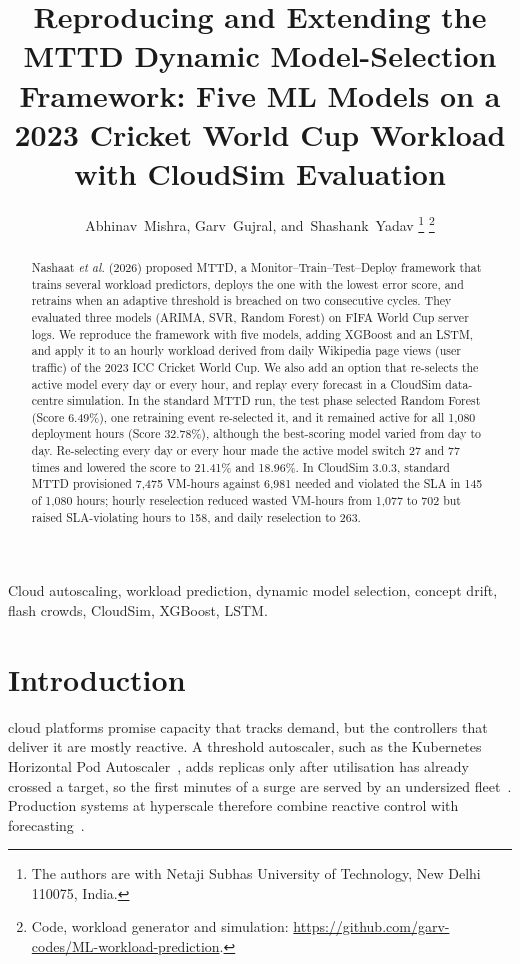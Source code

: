 \documentclass[journal,onecolumn,11pt]{IEEEtran}
\begin{document}
\title{Reproducing and Extending the MTTD Dynamic Model-Selection Framework: Five ML Models on a 2023 Cricket World Cup Workload with CloudSim Evaluation}

\author{Abhinav~Mishra, Garv~Gujral, and~Shashank~Yadav%
\thanks{The authors are with Netaji Subhas University of Technology, New Delhi 110075, India.}%
\thanks{Code, workload generator and simulation: \url{https://github.com/garv-codes/ML-workload-prediction}.}}

\maketitle

\begin{abstract}
Nashaat \emph{et al.} (2026) proposed MTTD, a Monitor--Train--Test--Deploy framework that trains several workload predictors, deploys the one with the lowest error score, and retrains when an adaptive threshold is breached on two consecutive cycles. They evaluated three models (ARIMA, SVR, Random Forest) on FIFA World Cup server logs. We reproduce the framework with five models, adding XGBoost and an LSTM, and apply it to an hourly workload derived from daily Wikipedia page views (user traffic) of the 2023 ICC Cricket World Cup. We also add an option that re-selects the active model every day or every hour, and replay every forecast in a CloudSim data-centre simulation. In the standard MTTD run, the test phase selected Random Forest (Score 6.49\%), one retraining event re-selected it, and it remained active for all 1,080 deployment hours (Score 32.78\%), although the best-scoring model varied from day to day. Re-selecting every day or every hour made the active model switch 27 and 77 times and lowered the score to 21.41\% and 18.96\%. In CloudSim 3.0.3, standard MTTD provisioned 7,475 VM-hours against 6,981 needed and violated the SLA in 145 of 1,080 hours; hourly reselection reduced wasted VM-hours from 1,077 to 702 but raised SLA-violating hours to 158, and daily reselection to 263.
\end{abstract}

\begin{IEEEkeywords}
Cloud autoscaling, workload prediction, dynamic model selection, concept drift, flash crowds, CloudSim, XGBoost, LSTM.
\end{IEEEkeywords}

\section{Introduction}
 cloud platforms promise capacity that tracks demand, but the controllers that deliver it are mostly reactive. A threshold autoscaler, such as the Kubernetes Horizontal Pod Autoscaler~\cite{k8shpa}, adds replicas only after utilisation has already crossed a target, so the first minutes of a surge are served by an undersized fleet~\cite{lorido2014,qu2018,herbst2013}. Production systems at hyperscale therefore combine reactive control with forecasting~\cite{rzadca2020,verma2015}.
\end{document}
